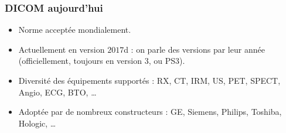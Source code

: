 	\frame
	{
		\frametitle{DICOM aujourd'hui}
		\begin{itemize}
			\item Norme accept\'ee mondialement.
			\item Actuellement en version $2017$d : on parle des versions par leur ann\'ee (officiellement, toujours en version 3, ou PS3).
			\item Diversit\'e des \'equipements support\'es : RX, CT, IRM, US, PET, SPECT, Angio, ECG, BTO, \ldots
			\item Adopt\'ee par de nombreux constructeurs : GE, Siemens, Philips, Toshiba, Hologic, \ldots
		\end{itemize}
	}
